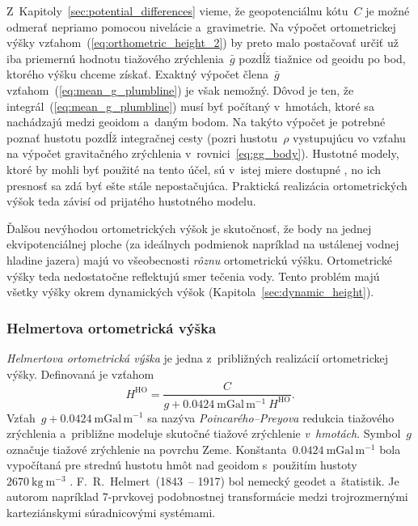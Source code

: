 \documentclass[a4paper, 12pt]{book}
\begin{document}
Z~Kapitoly~\ref{sec:potential_differences} vieme, že geopotenciálnu kótu~$C$ je 
možné odmerať nepriamo pomocou nivelácie a~gravimetrie.  Na výpočet 
ortometrickej výšky vzťahom~(\ref{eq:orthometric_height_2}) by preto malo 
postačovať určiť už iba priemernú hodnotu tiažového zrýchlenia~$\bar{g}$ pozdĺž 
tiažnice od geoidu po bod, ktorého výšku chceme získať.  Exaktný výpočet 
člena~$\bar{g}$ vzťahom~(\ref{eq:mean_g_plumbline}) je však nemožný.  Dôvod je 
ten, že integrál~(\ref{eq:mean_g_plumbline}) musí byť počítaný v~hmotách, ktoré 
sa nachádzajú medzi geoidom a~daným bodom.  Na takýto výpočet je potrebné 
poznať hustotu pozdĺž integračnej cesty (pozri hustotu~$\rho$ vystupujúcu vo 
vzťahu na výpočet gravitačného zrýchlenia v~rovnici~\ref{eq:gg_body}).  
Hustotné modely, ktoré by mohli byť použité na tento účel, sú v~istej miere 
dostupné \parencite[napríklad][]{Sheng2019}, no ich presnosť sa zdá byť ešte 
stále nepostačujúca.  Praktická realizácia ortometrických výšok teda závisí od 
prijatého hustotného modelu.

Ďalšou nevýhodou ortometrických výšok je skutočnosť, že body na jednej 
ekvipotenciálnej ploche (za ideálnych podmienok napríklad na ustálenej vodnej 
hladine jazera) majú vo všeobecnosti \emph{rôznu} ortometrickú výšku.  
Ortometrické výšky teda nedostatočne reflektujú smer tečenia vody.  Tento 
problém majú všetky výšky okrem dynamických výšok 
(Kapitola~\ref{sec:dynamic_height}).

\subsubsection{Helmertova ortometrická výška}
\label{sec:helmert_height}

\emph{Helmertova ortometrická výška} je jedna z~približných realizácií 
ortometrickej výšky.  Definovaná je vzťahom
%
\begin{equation}
\label{eq:helmert_height}
H^\mathrm{HO} = \frac{C}{g + 0.0424\ \mathrm{mGal} \, \mathrm{m}^{-1} 
\ H^\mathrm{HO}}{.}
\end{equation}
%
Vzťah~$g + 0.0424\ \mathrm{mGal} \, \mathrm{m}^{-1}$ sa nazýva 
\emph{Poincarého--Preyova} redukcia tiažového zrýchlenia a~približne modeluje 
skutočné tiažové zrýchlenie \emph{v~hmotách}.  Symbol~$g$ označuje tiažové 
zrýchlenie na povrchu Zeme.  Konštanta~$0.0424\ \mathrm{mGal} \, 
\mathrm{m}^{-1}$ bola vypočítaná pre strednú hustotu hmôt nad geoidom 
s~použitím hustoty~$2670\ \mathrm{kg} \ \mathrm{m}^{-3}$ \parencite[pre 
odvodenie pozri 
napríklad][]{Jekeli2000a,MoritzPhysicalGeodesy,SansoGeodeticHeights}.  
F.~R.~Helmert~(1843~-- 1917) bol nemecký geodet a~štatistik.  Je autorom 
napríklad 7-prvkovej podobnostnej transformácie medzi trojrozmernými 
karteziánskymi súradnicovými systémami.
\end{document}
